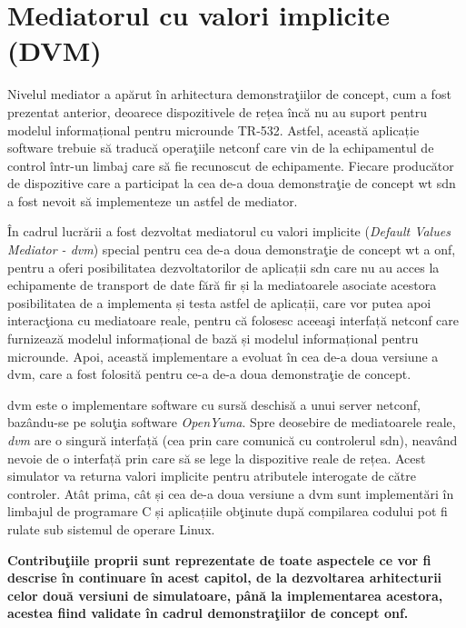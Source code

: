 \chapter{Mediatorul cu valori implicite (DVM)\label{ch:dvm_v01}}

\graphicspath{ {cap-dvm_v01/figures/} }

Nivelul mediator a apărut în arhitectura demonstraţiilor de concept, cum a fost prezentat anterior, deoarece dispozitivele de rețea încă nu au suport pentru modelul informațional pentru microunde TR-532. Astfel, această aplicație software trebuie să traducă operaţiile \gls{netconf} care vin de la echipamentul de control într-un limbaj care să fie recunoscut de echipamente. Fiecare producător de dispozitive care a participat la cea de-a doua demonstraţie de concept \gls{wt} \gls{sdn} a fost nevoit să implementeze un astfel de mediator.

În cadrul lucrării a fost dezvoltat mediatorul cu valori implicite (\textit{Default Values Mediator - \gls{dvm}}) special pentru cea de-a doua demonstraţie de concept \gls{wt} a \gls{onf}, pentru a oferi posibilitatea dezvoltatorilor de aplicații \gls{sdn} care nu au acces la echipamente de transport de date fără fir și la mediatoarele asociate acestora posibilitatea de a implementa și testa astfel de aplicații, care vor putea apoi interacţiona cu mediatoare reale, pentru că folosesc aceeaşi interfață \gls{netconf} care furnizează modelul informațional de bază și modelul informațional pentru microunde. Apoi, această implementare a evoluat în cea de-a doua versiune a \gls{dvm}, care a fost folosită pentru ce-a de-a doua demonstraţie de concept.

\gls{dvm} este o implementare software cu sursă deschisă a unui server \gls{netconf}, bazându-se pe soluţia software \textit{OpenYuma}. Spre deosebire de mediatoarele reale, \textit{\gls{dvm}} are o singură interfață (cea prin care comunică cu controlerul \gls{sdn}), neavând nevoie de o interfață prin care să se lege la dispozitive reale de rețea. Acest simulator va returna valori implicite pentru atributele interogate de către controler. Atât prima, cât și cea de-a doua versiune a \gls{dvm} sunt implementări în limbajul de programare C și aplicațiile obţinute după compilarea codului pot fi rulate sub sistemul de operare Linux.

\textbf{Contribuţiile proprii sunt reprezentate de toate aspectele ce vor fi descrise în continuare în acest capitol, de la dezvoltarea arhitecturii celor două versiuni de simulatoare, până la implementarea acestora, acestea fiind validate în cadrul demonstraţiilor de concept \gls{onf}.}







